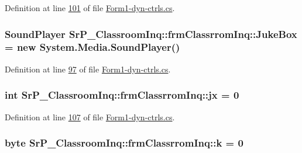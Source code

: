 \-Definition at line \hyperlink{_form1-dyn-ctrls_8cs_source_l00101}{101} of file \hyperlink{_form1-dyn-ctrls_8cs_source}{\-Form1-\/dyn-\/ctrls.\-cs}.

\hypertarget{class_sr_p___classroom_inq_1_1frm_classrrom_inq_a10f0b7ba2800c1353aeee71344d08a94}{
\subsubsection[{\-Juke\-Box}]{\setlength{\rightskip}{0pt plus 5cm}\-Sound\-Player {\bf \-Sr\-P\-\_\-\-Classroom\-Inq\-::frm\-Classrrom\-Inq\-::\-Juke\-Box} = new \-System.\-Media.\-Sound\-Player()}}
\label{class_sr_p___classroom_inq_1_1frm_classrrom_inq_a10f0b7ba2800c1353aeee71344d08a94}


\-Definition at line \hyperlink{_form1-dyn-ctrls_8cs_source_l00097}{97} of file \hyperlink{_form1-dyn-ctrls_8cs_source}{\-Form1-\/dyn-\/ctrls.\-cs}.

\hypertarget{class_sr_p___classroom_inq_1_1frm_classrrom_inq_a6206484c9b4d5d7558f8904cad77cded}{
\subsubsection[{jx}]{\setlength{\rightskip}{0pt plus 5cm}int {\bf \-Sr\-P\-\_\-\-Classroom\-Inq\-::frm\-Classrrom\-Inq\-::jx} = 0}}
\label{class_sr_p___classroom_inq_1_1frm_classrrom_inq_a6206484c9b4d5d7558f8904cad77cded}


\-Definition at line \hyperlink{_form1-dyn-ctrls_8cs_source_l00107}{107} of file \hyperlink{_form1-dyn-ctrls_8cs_source}{\-Form1-\/dyn-\/ctrls.\-cs}.

\hypertarget{class_sr_p___classroom_inq_1_1frm_classrrom_inq_ad13cb123edd99d95b379613aad0f2a39}{
\subsubsection[{k}]{\setlength{\rightskip}{0pt plus 5cm}byte {\bf \-Sr\-P\-\_\-\-Classroom\-Inq\-::frm\-Classrrom\-Inq\-::k} = 0}}
\label{class_sr_p___classroom_inq_1_1frm_classrrom_inq_ad13cb123edd99d95b379613aad0f2a39}


